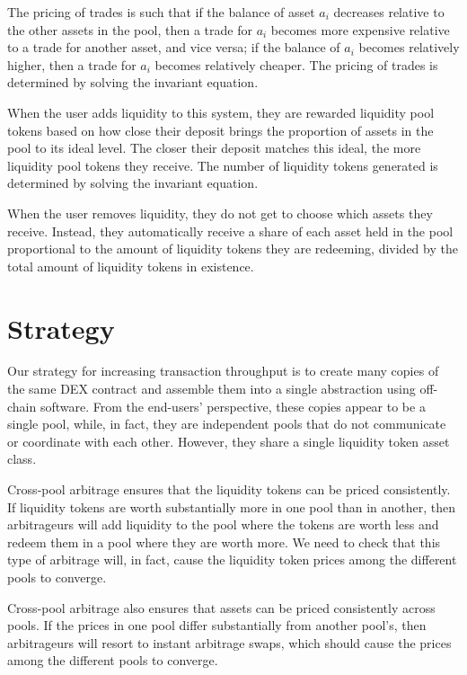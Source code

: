 \documentclass[12pt]{article}
\begin{document}
The pricing of trades is such that if the balance of asset $a_i$ decreases relative to the other assets in the pool, then a trade for $a_i$ becomes more
expensive relative to a trade for another asset, and vice versa; if the balance of $a_i$ becomes relatively higher, then a trade for $a_i$ becomes relatively cheaper. The pricing of trades is determined by solving the invariant equation.

When the user adds liquidity to this system, they are rewarded liquidity pool tokens based on how close their deposit brings the proportion of assets in the pool to its ideal level. The closer their deposit matches this ideal, the more liquidity pool tokens they receive. The number of liquidity tokens generated is determined by solving the invariant equation.

When the user removes liquidity, they do not get to choose which assets they receive. Instead, they automatically receive a share of each asset held in the pool proportional to the amount of liquidity tokens they are redeeming, divided by the total amount of liquidity tokens in existence. 

\section{Strategy}

Our strategy for increasing transaction throughput is to create many copies of the same DEX contract and assemble them into a single abstraction using off-chain software. From the end-users' perspective, these copies appear to be a single pool, while, in fact, they are independent pools that do not communicate or coordinate with each other. However, they share a single liquidity token asset class.

Cross-pool arbitrage ensures that the liquidity tokens can be priced consistently. If liquidity tokens are worth substantially more in one pool than in another, then arbitrageurs
will add liquidity to the pool where the tokens are worth less and redeem them in
a pool where they are worth more. We need to check that this type of arbitrage will, in fact, cause the liquidity token prices among the different pools to converge.

Cross-pool arbitrage also ensures that assets can be priced consistently across pools.
If the prices in one pool differ substantially from another pool's, then arbitrageurs
will resort to instant arbitrage swaps, which should cause the prices among the different pools to converge.
\end{document}

